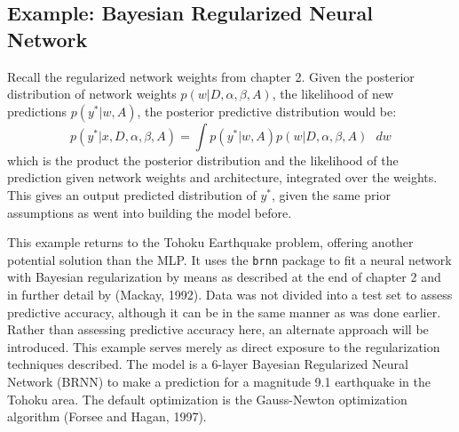 \subsection{Example: Bayesian Regularized Neural Network}

Recall the regularized network weights from chapter 2. Given the posterior distribution of network weights $p(w|D,\alpha,\beta,A)$, the likelihood of new predictions $p(y^*|w,A)$, the posterior predictive distribution would be:
$$
p(y^*|x,D,\alpha,\beta,A) = \int p(y^*|w,A) p(w|D,\alpha,\beta,A) \text{ } dw
$$
which is the product the posterior distribution and the likelihood of the prediction given network weights and architecture, integrated over the weights.  This gives an output predicted distribution of $y^*$, given the same prior assumptions as went into building the model before.

This example returns to the Tohoku Earthquake problem, offering another potential solution than the MLP.  It uses the \texttt{brnn} package \cite{brnn} to fit a neural network with Bayesian regularization by means as described at the end of chapter 2 and in further detail by (Mackay, 1992).  Data was not divided into a test set to assess predictive accuracy, although it can be in the same manner as was done earlier.  Rather than assessing predictive accuracy here, an alternate approach will be introduced.  This example serves merely as direct exposure to the regularization techniques described.
The model is a 6-layer Bayesian Regularized Neural Network (BRNN) to make a prediction for a magnitude 9.1 earthquake in the Tohoku area. %
The default optimization is the Gauss-Newton optimization algorithm (Forsee and Hagan, 1997).

